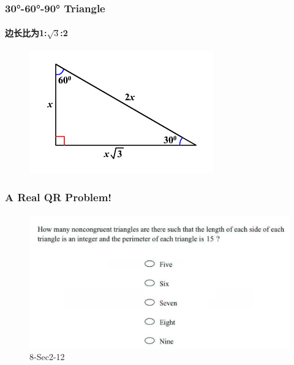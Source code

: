 \documentclass[
	11pt, %
]{beamer}
\begin{document}

\begin{frame}
	\frametitle{30°-60°-90° Triangle} %
	\framesubtitle{边长比为1:$\sqrt{3}$:2}
	\begin{figure}
		\includegraphics[width=0.5\linewidth]{30_60_90_triangle.png}
	\end{figure}	
\end{frame}




\begin{frame}
	\frametitle{A Real QR Problem!}
	\framesubtitle{}
	\begin{figure}
		\includegraphics[width=\linewidth]{Triangle_Inequalities_Example_Question1.png}
		\caption{8-Sec2-12}
	\end{figure}

\end{frame}

\end{document}
